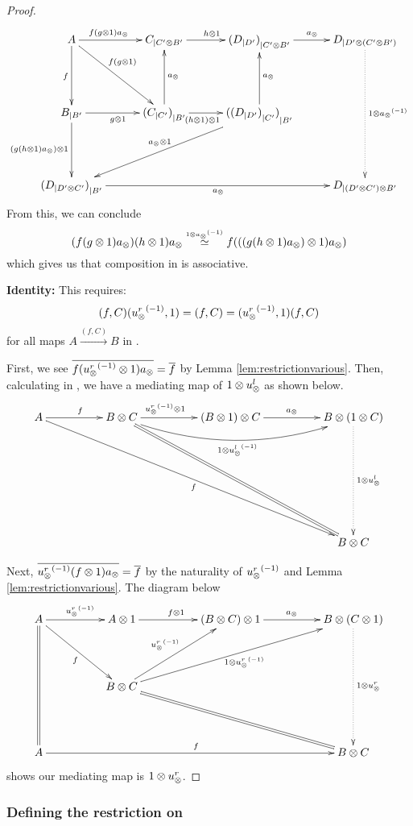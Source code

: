 \begin{proof}
  \[
    \xymatrix @C=30pt @R=45pt{
      A \ar[d]_f \ar[r]^(.4){f (g\*1) a_{\*}} \ar[dr]^(.4){f(g\*1)} &
        \xtdmn{C}{C' \* B'} \ar[r]^{h\*1}
        & \xtdmn{(\xtdmn{D}{D'})}{C' \* B'} \ar[r]^{a_{\*}}
        & \xtdmn{D}{D' \* (C' \* B')}
        \ar@{.>}[dd]^{1\*\inv{a_{\*}}}\\
      \xtdmn{B}{B'} \ar[d]_{(g (h\*1) a_{\*})\*1} \ar[r]_{g\*1}
        &\xtdmn{(\xtdmn{C}{C'})}{B'} \ar[u]_{a_{\*}} \ar[r]_(.4){(h\*1)\*1}
        & \xtdmn{(\xtdmn{(\xtdmn{D}{D'})}{C'})}{B'}
        \ar[u]_{a_\*} \ar[dll]_{a_{\*}\*1}
      \\
      \xtdmn{(\xtdmn{D}{D' \* C'})}{B'}  \ar[rrr]_{a_{\*}}
        &&& \xtdmn{D}{(D' \* C') \* B'} %
    }
  \]
  From this, we can conclude
  \[
    (f(g\otimes1)a_{\otimes}) (h\otimes1)a_{\otimes} \overset{\scriptscriptstyle 1\otimes{a_{\otimes}}^{(-1)}}{\simeq} f (((g(h\otimes1)a_{\otimes})\otimes1) a_{\otimes})
  \]
  which gives us that composition in \Xt is associative.

  \textbf{Identity:} This requires:
  \[
    (f,C) ({u_{\otimes}^r}^{(-1)}, 1) = (f,C) = ({u_{\otimes}^r}^{(-1)}, 1) (f,C)
  \]
  for all maps $A\xrightarrow{(f,C)}B$ in \Xt.

  First, we see $\overline{f ({u_{\otimes}^r}^{(-1)}\otimes1) a_{\otimes}} = \overline{f}$ by Lemma
  \vref{lem:restrictionvarious}. Then, calculating in \X, we have a mediating map of
  $1 \otimes u_{\otimes}^l$ as shown below.
  \[
    \xymatrix @C=50pt @R=45pt{
      A \ar[r]^f \ar[ddrrr]_f&
        B \* C \ar[r]^(.4){\inv{\usr}\*1}
        \ar@/_20pt/[rr]_{1 \* \inv{\usl}}
        \ar@{=}[ddrr]
        & (B \* 1) \* C \ar[r]^{a_{\*}}
        & B \* (1 \* C) \ar@{.>}[dd]^{1 \* \usl} \\
      \\
      &&& B \* C
    }
  \]

  Next, $\overline{{u_{\otimes}^r}^{(-1)} (f \otimes1)  a_{\otimes}} = \overline{f}$ by the naturality of ${u_{\otimes}^r}^{(-1)}$ and
  Lemma \vref{lem:restrictionvarious}. The diagram below
  \[
    \xymatrix @C=50pt @R=45pt{
      A \ar@{=}[dd] \ar[r]^{\inv{\usr}} \ar[dr]_{f}
        &      A \* 1 \ar[r]^{f \* 1}
        & (B \* C) \* 1 \ar[r]^{a_{\*}}
        & B \* (C \* 1)\ar@{.>}[dd]^{1 \* \usr} \\
      &B\*C \ar[ur]^{\inv{\usr}} \ar[urr]_{1\*\inv{\usr}} \ar@{=}[drr]\\
      A \ar[rrr]^f &&& B \* C
    }
  \]
  shows our mediating map is $1 \otimes u_{\otimes}^r$.
\end{proof}

\subsubsection{Defining the restriction on \hypXt} %
\label{ssub:defining_the_restriction_on_hypxt}



